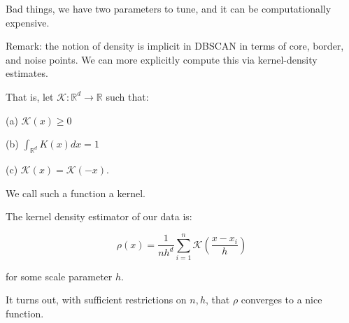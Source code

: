\documentclass[10pt]{article}
\begin{document}
Bad things, we have two parameters to tune, and it can be computationally expensive.

Remark: the notion of density is implicit in DBSCAN in terms of core, border, and noise points. We can more explicitly compute this via kernel-density estimates.

That is, let $\mathcal{K}: \mathbb{R}^d \to \mathbb{R}$ such that:

(a) $\mathcal{K}(x) \geq 0$

(b) $\int_{\mathbb{R}^d} K(x) dx = 1$

(c) $\mathcal{K}(x) = \mathcal{K}(-x)$.

We call such a function a kernel.

The kernel density estimator of our data is:

$$\rho(x) = \frac{1}{nh^d} \sum_{i=1}^n \mathcal{K}\left(  \frac{ x - x_i}{h}\right)$$

for some scale parameter $h$.

It turns out, with sufficient restrictions on $n, h$, that $\rho$ converges to a nice function.
\end{document}

